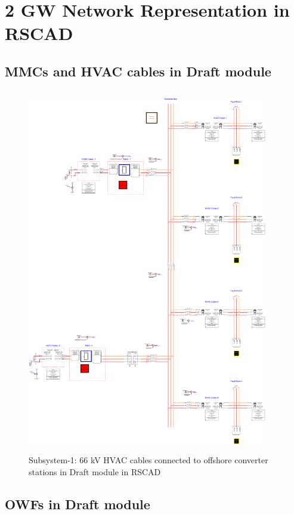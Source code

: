 \chapter{2 GW Network Representation in RSCAD}

\section{MMCs and HVAC cables in Draft module}
\begin{figure}[H]
\centering
    \includegraphics[height = 16cm,width = 10.5cm]{Diagrams/Appendix_C/MMC_2_RSCAD_Rep.pdf}
    \caption{Subsystem-1: 66 kV HVAC cables connected to offshore converter stations in Draft module in RSCAD}
    \label{fig:MMC_2_RSCAD_Rep}
\end{figure}

\section{OWFs in Draft module}

